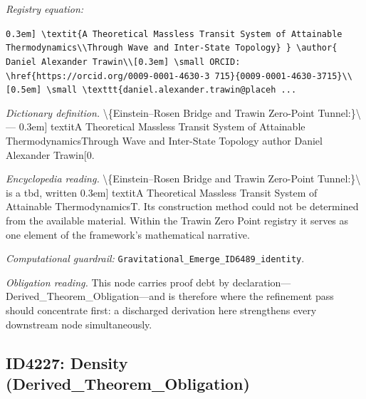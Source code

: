 \documentclass[11pt]{article}
\theoremstyle{remark}
\begin{document}
\noindent\textit{Registry equation:}\par
{\small\texttt{0.3em] \textbackslash{}textit\{A Theoretical Massless Transit System of Attainable Thermodynamics\textbackslash{}\textbackslash{}Through Wave and Inter-State Topology\} \} \textbackslash{}author\{ Daniel Alexander Trawin\textbackslash{}\textbackslash{}[0.3em] \textbackslash{}small ORCID: \textbackslash{}href\{https://orcid.org/0009-0001-4630-3 715\}\{0009-0001-4630-3715\}\textbackslash{}\textbackslash{}[0.5em] \textbackslash{}small \textbackslash{}texttt\{daniel.alexander.trawin@placeh ...}}\par\medskip
\noindent\textit{Dictionary definition.} \textbackslash{}\{Einstein--Rosen Bridge and Trawin Zero-Point Tunnel:\}\textbackslash{} --- 0.3em] textitA Theoretical Massless Transit System of Attainable ThermodynamicsThrough Wave and Inter-State Topology author Daniel Alexander Trawin[0.\par\medskip
\noindent\textit{Encyclopedia reading.} \textbackslash{}\{Einstein--Rosen Bridge and Trawin Zero-Point Tunnel:\}\textbackslash{} is a tbd, written 0.3em] textitA Theoretical Massless Transit System of Attainable ThermodynamicsT. Its construction method could not be determined from the available material. Within the Trawin Zero Point registry it serves as one element of the framework's mathematical narrative.
\par\medskip\noindent\textit{Computational guardrail:} \texttt{Gravitational\_Emerge\_ID6489\_identity}.
\par\medskip\noindent\textit{Obligation reading.} This node carries proof debt by declaration---Derived\_Theorem\_Obligation---and is therefore where the refinement pass should concentrate first: a discharged derivation here strengthens every downstream node simultaneously.

\subsection{ID4227: Density (Derived\_Theorem\_Obligation)}
\end{document}
